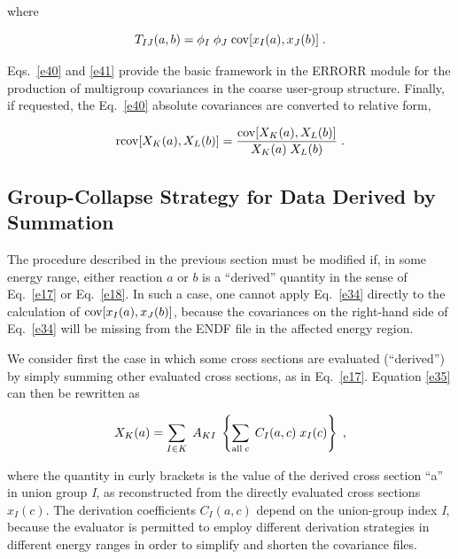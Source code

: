 \noindent
where

\begin{equation}
T_{IJ}(a,b) = \phi_I\;\phi_J \; {\rm cov} [x_I(a),x_J(b)]\;.
\label{e41}
\end{equation}
\vspace{1 pt}

\noindent
Eqs.~\ref{e40} and \ref{e41} provide the basic framework in the ERRORR
module for the production of multigroup covariances in the coarse user-group
structure.  Finally, if requested, the Eq.~\ref{e40} absolute covariances
are converted to relative form,

\begin{equation}
{\rm r{\rm cov}} [X_K(a),X_L(b)] =
  \frac{{\rm cov} [X_K(a),X_L(b)]}{X_K(a)\;X_L(b)} \;.
\label{e42}
\end{equation}

\subsection{Group-Collapse Strategy for Data Derived by Summation}
\label{ssERRORR_summ}

The procedure described in the previous section must be modified if, in
some energy range, either reaction $a$ or $b$ is a ``derived'' quantity
in the sense of Eq.~\ref{e17} or Eq.~\ref{e18}.  In such a case, one
cannot apply Eq.~\ref{e34} directly to the calculation of
${\rm {\rm cov}}[x_I (a),x_J(b)]$, because the covariances on the
right-hand side of Eq.~\ref{e34} will be missing from the ENDF file in
the affected energy region.

We consider first the case in which some cross sections are evaluated
(``derived'') by simply summing other evaluated cross sections, as in
Eq.~\ref{e17}.  Equation \ref{e35} can then be rewritten as

\begin{equation}
X_K(a) = \sum_{I\in K} \; A_{KI} \;\left\{\sum_{{\rm all\; c}} \;
  C_I(a,c)\;x_I(c)\right\} \;,
\end{equation}

\noindent
where the quantity in curly brackets is the value of the derived cross
section ``a'' in union group {\it I}, as reconstructed from the
directly evaluated cross sections $x_I (c)$.  The derivation
coefficients $C_I (a,c)$ depend on the union-group index {\it I},
because the evaluator is permitted to employ different derivation
strategies in different energy ranges in order to simplify and shorten
the covariance files.

